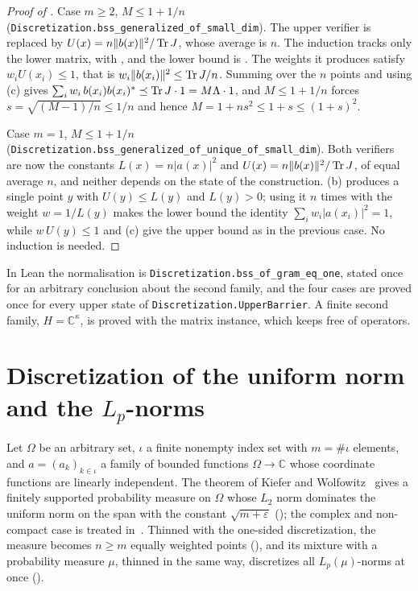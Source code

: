 \begin{proof}[Proof of ]
Case $m \geq 2$, $M \leq 1 + 1/n$
(\texttt{Discretization.bss\_generalized\_of\_small\_dim}). The upper verifier is replaced
by $U(x) = n \|b(x)\|^2 / \operatorname{Tr} J$, whose average is $n$. The induction tracks only the lower
matrix, with , and the lower bound is
. The weights it produces satisfy
$w_i U(x_i) \leq 1$, that is $w_i \|b(x_i)\|^2 \leq \operatorname{Tr} J / n$. Summing over the $n$
points and using (c) gives
$\sum_i w_i \, b(x_i) b(x_i)^* \preceq \operatorname{Tr} J \cdot 1 = M \Lambda \cdot 1$, and
$M \leq 1 + 1/n$ forces $s = \sqrt{(M-1)/n} \leq 1/n$ and hence
$M = 1 + n s^2 \leq 1 + s \leq (1+s)^2$.

Case $m = 1$, $M \leq 1 + 1/n$
(\texttt{Discretization.bss\_generalized\_of\_unique\_of\_small\_dim}). Both verifiers are
now the constants $L(x) = n |a(x)|^2$ and $U(x) = n \|b(x)\|^2 / \operatorname{Tr} J$, of equal average
$n$, and neither depends on the state of the construction.
(b) produces a single point $y$ with $U(y) \leq L(y)$ and
$L(y) > 0$; using it $n$ times with the weight $w = 1/L(y)$ makes the lower bound the
identity $\sum_i w_i |a(x_i)|^2 = 1$, while $w \, U(y) \leq 1$ and
(c) give the upper bound as in the previous case. No
induction is needed.
\end{proof}

In Lean the normalisation is \texttt{Discretization.bss\_of\_gram\_eq\_one}, stated once
for an arbitrary conclusion about the second family, and the four cases are proved once
for every upper state of \texttt{Discretization.UpperBarrier}. A finite second family,
$H = \mathbb{C}^{\kappa}$, is proved with the matrix instance, which keeps 
free of operators.

\chapter{Discretization of the uniform norm and the $L_p$-norms}
\label{ch:uniform-lp}

Let $\Omega$ be an arbitrary set, $\iota$ a finite nonempty index set with $m = \#\iota$
elements, and $a = (a_k)_{k \in \iota}$ a family of bounded functions
$\Omega \to \mathbb{C}$ whose coordinate functions are linearly independent. The theorem of
Kiefer and Wolfowitz~\cite{KW} gives a finitely supported probability measure on $\Omega$
whose $L_2$ norm dominates the uniform norm on the span with the constant
$\sqrt{m + \varepsilon}$ (); the complex and non-compact
case is treated in~\cite{KPUU}. Thinned with the one-sided discretization, the measure
becomes $n \geq m$ equally weighted points (), and
its mixture with a probability measure $\mu$, thinned in the same way, discretizes all
$L_p(\mu)$-norms at once ().

